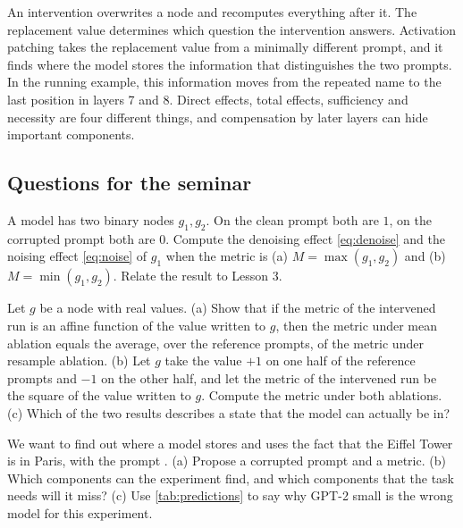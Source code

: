 \begin{takeaways}
An intervention overwrites a node and recomputes everything after it. The replacement value determines which
question the intervention answers. Activation patching takes the replacement value from a minimally different
prompt, and it finds where the model stores the information that distinguishes the two prompts. In the running
example, this information moves from the repeated name to the last position in layers 7 and 8. Direct effects,
total effects, sufficiency and necessity are four different things, and compensation by later layers can hide
important components.
\end{takeaways}

\subsection*{Questions for the seminar}

\begin{exercise}\label{ex:andor}
A model has two binary nodes $g_1,g_2$. On the clean prompt both are $1$, on the corrupted prompt both are $0$.
Compute the denoising effect \eqref{eq:denoise} and the noising effect \eqref{eq:noise} of $g_1$ when the metric
is (a) $M=\max(g_1,g_2)$ and (b) $M=\min(g_1,g_2)$. Relate the result to Lesson 3.
\end{exercise}

\begin{exercise}\label{ex:meanresample}
Let $g$ be a node with real values. (a) Show that if the metric of the intervened run is an affine function of
the value written to $g$, then the metric under mean ablation equals the average, over the reference prompts, of
the metric under resample ablation. (b) Let $g$ take the value $+1$ on one half of the reference prompts and
$-1$ on the other half, and let the metric of the intervened run be the square of the value written to $g$.
Compute the metric under both ablations. (c) Which of the two results describes a state that the model can
actually be in?
\end{exercise}

\begin{exercise}\label{ex:design}
We want to find out where a model stores and uses the fact that the Eiffel Tower is in Paris, with the prompt
. (a) Propose a corrupted prompt and a metric. (b) Which
components can the experiment find, and which components that the task needs will it miss? (c) Use
\cref{tab:predictions} to say why GPT-2 small is the wrong model for this experiment.
\end{exercise}

